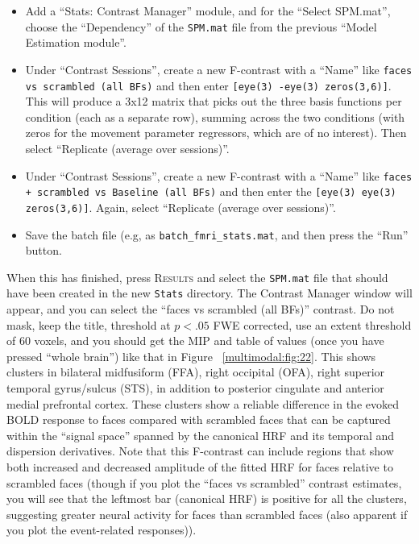 \begin{itemize}
\item Add a ``Stats: Contrast Manager'' module, and for the ``Select SPM.mat'', choose the ``Dependency'' of the \texttt{SPM.mat} file from the previous ``Model Estimation module''.

\item Under ``Contrast Sessions'', create a new F-contrast with a ``Name'' like \texttt{faces vs scrambled (all BFs)} and then enter  \texttt{[eye(3) -eye(3) zeros(3,6)]}. This will produce a 3x12 matrix that picks out the three basis functions per condition (each as a separate row), summing across the two conditions (with zeros for the movement parameter regressors, which are of no interest). Then select ``Replicate (average over sessions)''.

\item Under ``Contrast Sessions'', create a new F-contrast with a ``Name'' like \texttt{faces + scrambled vs Baseline (all BFs)} and then enter the \matlab \texttt{[eye(3) eye(3) zeros(3,6)]}. Again, select ``Replicate (average over sessions)''.

\item Save the batch file (e.g, as \texttt{batch\_fmri\_stats.mat}, and then press the ``Run'' button.

\end{itemize}

When this has finished, press \textsc{Results} and select the \texttt{SPM.mat} file that should have been created in the new \texttt{Stats} directory. The Contrast Manager window will appear, and you can select the ``faces vs scrambled (all BFs)'' contrast. Do not mask, keep the title, threshold at $p<.05$ FWE corrected, use an extent threshold of 60 voxels, and you should get the MIP and table of values (once you have pressed ``whole brain'') like that in Figure ~\ref{multimodal:fig:22}. This shows clusters in bilateral midfusiform (FFA), right occipital (OFA), right superior temporal gyrus/sulcus (STS), in addition to posterior cingulate and anterior medial prefrontal cortex. These clusters show a reliable difference in the evoked BOLD response to faces compared with scrambled faces that can be captured within the ``signal space'' spanned by the canonical HRF and its temporal and dispersion derivatives. Note that this F-contrast can include regions that show both increased and decreased amplitude of the fitted HRF for faces relative to scrambled faces (though if you plot the ``faces vs scrambled'' contrast estimates, you will see that the leftmost bar (canonical HRF) is positive for all the clusters, suggesting greater neural activity for faces than scrambled faces (also apparent if you plot the event-related responses)).

